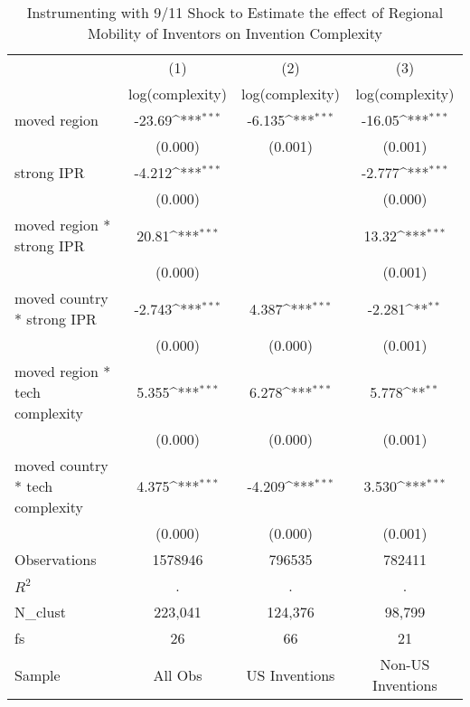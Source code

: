 {
\def\sym#1{\ifmmode^{#1}\else\(^{#1}\)\fi}
\begin{longtable}{l*{3}{c}}
\caption{Instrumenting with 9/11 Shock to Estimate the effect of Regional Mobility of Inventors on Invention Complexity \label{model9a9b9c}}\\
\hline\hline\endfirsthead\hline\endhead\hline\endfoot\endlastfoot
                &\multicolumn{1}{c}{(1)}&\multicolumn{1}{c}{(2)}&\multicolumn{1}{c}{(3)}\\
                &\multicolumn{1}{c}{log(complexity)}&\multicolumn{1}{c}{log(complexity)}&\multicolumn{1}{c}{log(complexity)}\\
\hline
moved region    &   -23.69\sym{***}&   -6.135\sym{***}&   -16.05\sym{***}\\
                &  (0.000)         &  (0.001)         &  (0.001)         \\
strong IPR      &   -4.212\sym{***}&                  &   -2.777\sym{***}\\
                &  (0.000)         &                  &  (0.000)         \\
moved region * strong IPR&    20.81\sym{***}&                  &    13.32\sym{***}\\
                &  (0.000)         &                  &  (0.001)         \\
moved country * strong IPR&   -2.743\sym{***}&    4.387\sym{***}&   -2.281\sym{**} \\
                &  (0.000)         &  (0.000)         &  (0.001)         \\
moved region * tech complexity&    5.355\sym{***}&    6.278\sym{***}&    5.778\sym{**} \\
                &  (0.000)         &  (0.000)         &  (0.001)         \\
moved country * tech complexity&    4.375\sym{***}&   -4.209\sym{***}&    3.530\sym{***}\\
                &  (0.000)         &  (0.000)         &  (0.001)         \\
\hline
Observations    &  1578946         &   796535         &   782411         \\
$R^2$              &        .         &        .         &        .         \\
N\_clust         &  223,041         &  124,376         &   98,799         \\
fs              &       26         &       66         &       21         \\
Sample          &  All Obs         &US Inventions         &Non-US Inventions         \\

\end{longtable}}
